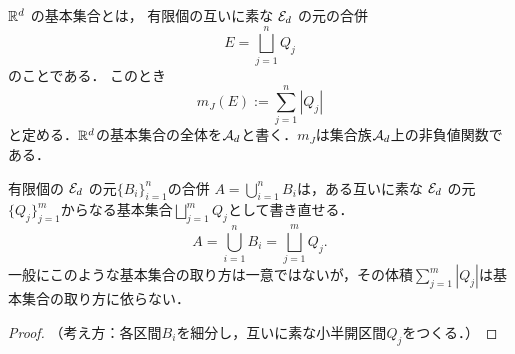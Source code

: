 \begin{definition}[基本集合]
$\mathbb R^d$ の基本集合とは，
有限個の互いに素な $\mathcal E_d$ の元の合併
\[
E = \bigsqcup_{j=1}^n Q_j
\]
のことである．
このとき
\[
m_J(E) := \sum_{j=1}^n |Q_j|
\]
と定める．$\mathbb R^d$の基本集合の全体を$\mathcal A_d$と書く．$m_J$は集合族$\mathcal A_d$上の非負値関数である．
\end{definition}

\begin{lemma}[格子分割]
有限個の $\mathcal E_d$ の元$\{B_i\}_{i=1}^n$の合併 $A = \bigcup_{i=1}^n B_i$は，ある互いに素な $\mathcal E_d$ の元$\{Q_j\}_{j=1}^m$からなる基本集合$\bigsqcup_{j=1}^m Q_j$として書き直せる．
\[
A = \bigcup_{i=1}^n B_i = \bigsqcup_{j=1}^m Q_j.
\]
一般にこのような基本集合の取り方は一意ではないが，その体積$\sum_{j=1}^m |Q_j|$は基本集合の取り方に依らない．
\end{lemma}
\begin{proof}
    （考え方：各区間$B_i$を細分し，互いに素な小半開区間$Q_j$をつくる．）
\end{proof}
%


